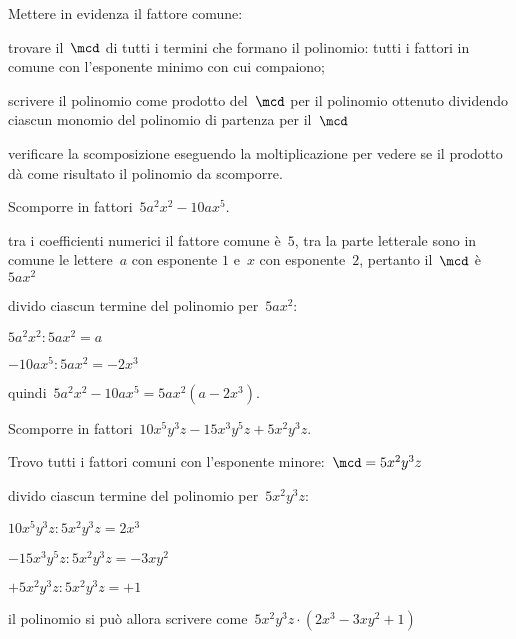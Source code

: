 \begin{procedura}
Mettere in evidenza il fattore comune:
\begin{enumeratea}
\item trovare il~\(\mcd\) di tutti i termini che formano il polinomio: tutti i 
 fattori in comune con l'esponente minimo con cui compaiono;
\item scrivere il polinomio come prodotto del~\(\mcd\) per il polinomio ottenuto 
 dividendo ciascun monomio del polinomio di partenza per il~\(\mcd\)
\item verificare la scomposizione eseguendo la moltiplicazione per vedere se 
 il prodotto dà come risultato il polinomio da scomporre.
\end{enumeratea}
\end{procedura}

 \begin{esempio}
Scomporre in fattori~\(5a^{2}x^{2}-10ax^{5}\).
  \begin{enumeratea}
  \item tra i coefficienti numerici il fattore comune è~\(5\), 
   tra la parte letterale sono in comune le lettere~\(a\) con esponente \(1\) 
   e~\(x\) con esponente~\(2\), pertanto il~\(\mcd\) è~\(5ax^{2}\)
 \item divido ciascun termine del polinomio per~\(5ax^{2}\):
   \begin{itemize*}
   \item \(5a^{2}x^{2}:5ax^{2}=a\)
   \item \(-10ax^{5}:5ax^{2}=-2x^{3}\)
   \end{itemize*}
  \item quindi~\(5a^{2}x^{2}-10ax^{5}=5ax^{2}(a-2x^{3})\).
  \end{enumeratea}
 \end{esempio}

 \begin{esempio}
Scomporre in fattori~\(10x^{5}y^{3}z-15x^{3}y^{5}z+5x^{2}y^{3}z\).
 \begin{enumeratea}
 \item Trovo tutti i fattori comuni con l'esponente minore:~\(\mcd=5x^{2}y^{3}z\)
 \item divido ciascun termine del polinomio per~\(5x^{2}y^{3}z\):
   \begin{itemize*}
   \item \(10x^{5}y^{3}z:5x^{2}y^{3}z=2x^{3}\)
   \item \(-15x^{3}y^{5}z:5x^{2}y^{3}z=-3xy^{2}\)
   \item \(+5x^{2}y^{3}z:5x^{2}y^{3}z=+1\)
   \end{itemize*}
 \item il polinomio si può allora scrivere 
  come~\(5x^{2}y^{3}z\cdot (2x^{3}-3xy^{2}+1)\)
 \end{enumeratea}
 \end{esempio}

